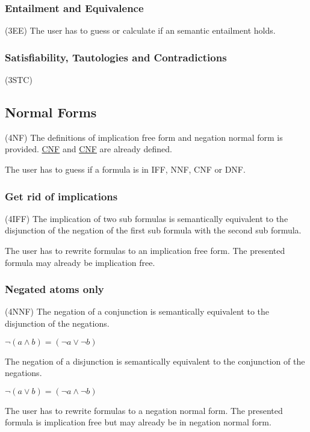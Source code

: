 \subsubsection{Entailment and Equivalence}
\label{tut:3EE}
(3EE)
The user has to guess or calculate if an semantic entailment holds. 



\subsubsection{Satisfiability, Tautologies and Contradictions}
\label{tut:3STC}
(3STC)

\subsection{Normal Forms}
\label{tut:4NF}
(4NF)
The definitions of implication free form and negation normal form is provided. 
\hyperref[tut:2CNF]{CNF} and \hyperref[tut:2DNF]{CNF} are already defined.

The user has to guess if a formula is in IFF, NNF, CNF or DNF.

\subsubsection{Get rid of implications}
\label{tut:4IFF}
(4IFF)
The implication of two sub formulas is semantically equivalent to the disjunction of the negation of the first sub formula with the second sub formula.

The user has to rewrite formulas to an implication free form.
The presented formula may already be implication free.

\subsubsection{Negated atoms only}
\label{tut:4NNF}
(4NNF)
The negation of a conjunction is semantically equivalent to the disjunction of the negations.

$\neg (a \wedge b) = (\neg a \vee \neg b)$

The negation of a disjunction is semantically equivalent to the conjunction of the negations.

$\neg (a \vee b) = (\neg a \wedge \neg b)$

The user has to rewrite formulas to a negation normal form.
The presented formula is implication free
but may already be in negation normal form.

